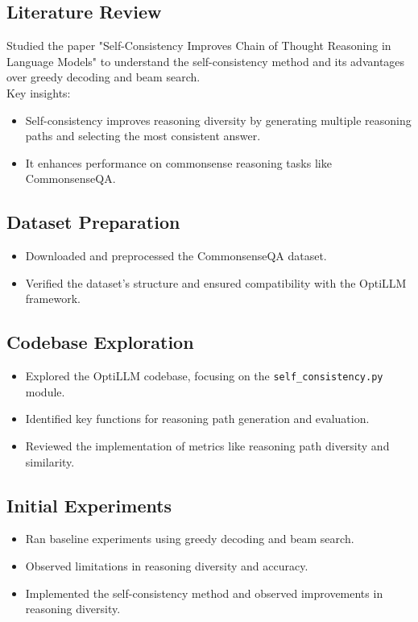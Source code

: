 \documentclass[a4paper,9pt]{article}
\begin{document}
\subsection*{Literature Review}
\noindent
Studied the paper "Self-Consistency Improves Chain of Thought Reasoning in Language Models" to understand the self-consistency method and its advantages over greedy decoding and beam search. \\
Key insights:
\begin{itemize}
    \item Self-consistency improves reasoning diversity by generating multiple reasoning paths and selecting the most consistent answer.
    \item It enhances performance on commonsense reasoning tasks like CommonsenseQA.
\end{itemize}

\subsection*{Dataset Preparation}
\noindent
\begin{itemize}
    \item Downloaded and preprocessed the CommonsenseQA dataset.
    \item Verified the dataset's structure and ensured compatibility with the OptiLLM framework.
\end{itemize}

\subsection*{Codebase Exploration}
\noindent
\begin{itemize}
    \item Explored the OptiLLM codebase, focusing on the \texttt{self\_consistency.py} module.
    \item Identified key functions for reasoning path generation and evaluation.
    \item Reviewed the implementation of metrics like reasoning path diversity and similarity.
\end{itemize}

\subsection*{Initial Experiments}
\noindent
\begin{itemize}
    \item Ran baseline experiments using greedy decoding and beam search.
    \item Observed limitations in reasoning diversity and accuracy.
    \item Implemented the self-consistency method and observed improvements in reasoning diversity.
\end{itemize}
\end{document}
